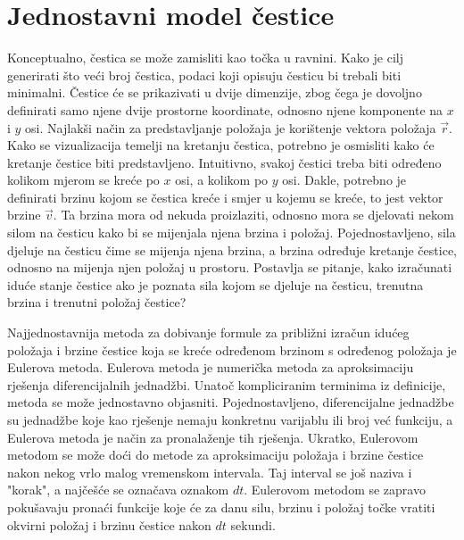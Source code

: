\documentclass{foi}
\begin{document}
\section{Jednostavni model čestice}
 Konceptualno, čestica se može zamisliti kao točka u ravnini. Kako je cilj generirati što veći broj čestica, podaci koji opisuju česticu bi trebali biti minimalni. Čestice će se prikazivati u dvije dimenzije, zbog čega je dovoljno definirati samo njene dvije prostorne koordinate, odnosno njene komponente na $x$ i $y$ osi. Najlakši način za predstavljanje položaja je korištenje vektora položaja $\vec{r}$. Kako se vizualizacija temelji na kretanju čestica, potrebno je osmisliti kako će kretanje čestice biti predstavljeno. Intuitivno, svakoj čestici treba biti određeno kolikom mjerom se kreće po $x$ osi, a kolikom po $y$ osi. Dakle, potrebno je definirati brzinu kojom se čestica kreće i smjer u kojemu se kreće, to jest vektor brzine $\vec{v}$. Ta brzina mora od nekuda proizlaziti, odnosno mora se djelovati nekom silom na česticu kako bi se mijenjala njena brzina i položaj. Pojednostavljeno, sila djeluje na česticu čime se mijenja njena brzina, a brzina određuje kretanje čestice, odnosno na mijenja njen položaj u prostoru. Postavlja se pitanje, kako izračunati iduće stanje čestice ako je poznata sila kojom se djeluje na česticu, trenutna brzina i trenutni položaj čestice?

 Najjednostavnija metoda za dobivanje formule za približni izračun idućeg položaja  i brzine čestice koja se kreće određenom brzinom s određenog položaja je Eulerova metoda. Eulerova metoda je numerička metoda za aproksimaciju rješenja diferencijalnih jednadžbi. Unatoč kompliciranim terminima iz definicije, metoda se može jednostavno objasniti. Pojednostavljeno, diferencijalne jednadžbe su jednadžbe koje kao rješenje nemaju konkretnu varijablu ili broj već funkciju, a Eulerova metoda je način za pronalaženje tih rješenja. Ukratko, Eulerovom metodom se može doći do metode za aproksimaciju položaja i brzine čestice nakon nekog vrlo malog vremenskom intervala. Taj interval se još naziva i "korak", a najčešće se označava oznakom $dt$. Eulerovom metodom se zapravo pokušavaju pronaći funkcije koje će za danu silu, brzinu i položaj točke vratiti okvirni položaj i brzinu čestice nakon $dt$ sekundi.
\end{document}

